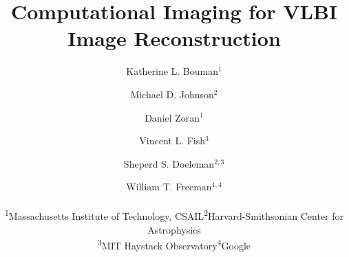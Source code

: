 \documentclass[12pt,letterpaper]{article}
\begin{document}
\title{Computational Imaging for VLBI Image Reconstruction \\ \vspace{0in} }


\author{Katherine L. Bouman$^{1}$
	\and
	Michael D. Johnson$^{2}$
	\and
	Daniel Zoran$^{1}$
	\and
	Vincent L. Fish$^{3}$
	\and
	Sheperd S. Doeleman$^{2,3}$
	\and
	William T. Freeman$^{1,4}$
	\\
	\small{ \hspace{-0.3in}
		\begin{tabular}{cc}
			\textsuperscript{1}Massachusetts Institute of Technology, CSAIL  & \textsuperscript{2}Harvard-Smithsonian Center for Astrophysics \\
			\textsuperscript{3}MIT Haystack Observatory &
			\textsuperscript{4}Google \\
		\end{tabular}
	}
}
\end{document}
